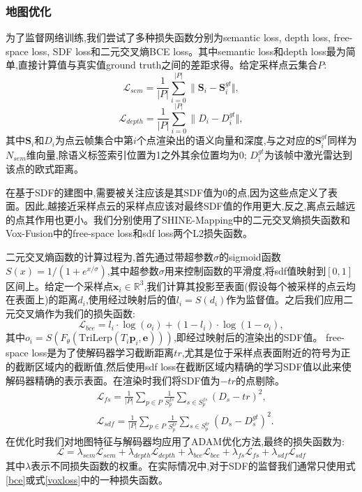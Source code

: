 \subsubsection{地图优化}
为了监督网络训练,我们尝试了多种损失函数分别为semantic loss, depth loss, free-space loss, SDF loss和二元交叉熵BCE loss。其中semantic loss和depth loss最为简单,直接计算值与真实值ground truth之间的差距求得。给定采样点云集合$P$:
\begin{equation}
    \mathcal{L}_{sem} = \frac{1}{|P|}\sum_{i=0}^{|P|}\| \mathbf{S}_i-\mathbf{S}_i^{gt}\Vert ,
\end{equation}
\begin{equation}
    \mathcal{L}_{depth} = \frac{1}{|P|}\sum_{i=0}^{|P|}\| D_i-D_i^{gt}\Vert ,
\end{equation}
其中$\mathbf{S}_i$和$D_i$为点云帧集合中第$i$个点渲染出的语义向量和深度,与之对应的$\mathbf{S}_i^{gt}$同样为$N_{sem}$维向量,除语义标签索引位置为1之外其余位置均为0; $D_i^{gt}$为该帧中激光雷达到该点的欧式距离。 

在基于SDF的建图中,需要被关注应该是其SDF值为0的点,因为这些点定义了表面。因此,越接近采样点云的采样点应该对最终SDF值的作用更大,反之,离点云越远的点其作用也更小。我们分别使用了SHINE-Mapping中的二元交叉熵损失函数和Vox-Fusion中的free-space loss和sdf loss两个L2损失函数。

二元交叉熵函数的计算过程为,首先通过带超参数$\sigma$的sigmoid函数$S(x) = 1/(1 + e^{x/\sigma})$,其中超参数$\sigma$用来控制函数的平滑度,将sdf值映射到$[0,1]$区间上。给定一个采样点$\mathbf{x}_i\in \mathbb{R}^3$,我们计算其投影至表面(假设每个被采样的点云均在表面上)的距离$d_i$,使用经过映射后的值$l_i=S(d_i)$作为监督值。之后我们应用二元交叉熵作为我们的损失函数:
\begin{equation}
    \mathcal{L}_{bce} = l_i\cdot \log(o_i)+(1-l_i)\cdot\log(1-o_i),\label{bce}
\end{equation}
其中$o_i=S(F_\theta(\mbox{TriLerp}(T_i\mathbf{p}_i,\mathbf{e})))$,即经过映射后的渲染出的SDF值。
free-space loss是为了使解码器学习截断距离$tr$,尤其是位于采样点表面附近的符号为正的截断区域内的截断值,然后使用sdf loss在截断区域内精确的学习SDF值以此来使解码器精确的表示表面。在渲染时我们将SDF值为$-tr$的点剔除。
\begin{equation}
    \begin{aligned}
        &\mathcal{L}_{fs} = \frac{1}{|P|}\sum_{p\in P}\frac{1}{S_p^{fs}}\sum_{s\in S_p^{fs}}(D_s-tr)^2,\\
    &\mathcal{L}_{sdf} = \frac{1}{|P|}\sum_{p\in P}\frac{1}{S_p^{tr}}\sum_{s\in S_p^{tr}}(D_s-D_s^{gt})^2.\label{voxloss}
    \end{aligned}
\end{equation}
在优化时我们对地图特征与解码器均应用了ADAM\cite{adam}优化方法,最终的损失函数为:
\begin{equation}
    \mathcal{L} = \lambda_{sem}\mathcal{L}_{sem}+\lambda_{depth}\mathcal{L}_{depth}+\lambda_{bce}\mathcal{L}_{bce}+\lambda_{fs}\mathcal{L}_{fs}+\lambda_{sdf}\mathcal{L}_{sdf}
\end{equation}
其中$\lambda$表示不同损失函数的权重。在实际情况中,对于SDF的监督我们通常只使用式\ref{bce}或式\ref{voxloss}中的一种损失函数。
